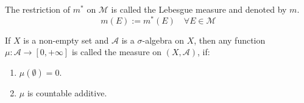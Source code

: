 \begin{definition}
    The restriction of $m^*$ on $\mathcal{M}$ is called the
    Lebesgue measure and denoted by $m$.
    \[ m(E) := m^*(E) \quad \forall E \in \mathcal{M} \]
\end{definition}
\begin{definition}
    If $X$ is a non-empty set and $\mathcal{A}$ is a $\sigma$-algebra on $X$,
    then any function $\mu : \mathcal{A} \to [0, +\infty]$ is called the measure
    on $(X, \mathcal{A})$, if:
    \begin{enumerate}
        \item {
            $\mu(\emptyset) = 0$.
        }
        \item {
            $\mu$ is countable additive.
        }
    \end{enumerate}
\end{definition}
